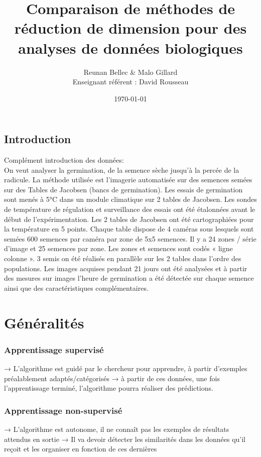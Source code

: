 \documentclass[12pt]{report}
\title{\textbf{Comparaison de méthodes de réduction de dimension pour des analyses de données biologiques}}
\author{Reunan Bellec \& Malo Gillard \\ Enseignant référent : David Rousseau}
\date{\today} %
\begin{document}
\maketitle

\tableofcontents

\thispagestyle{empty} %

\chapter*{Introduction}

Complément introduction des données:\\

On veut analyser la germination, de la semence sèche jusqu’à la percée de la radicule. La méthode utilisée est l'imagerie automatisée sur des semences semées sur des Tables de Jacobsen (bancs de germination).
Les essais de germination sont menés à 5°C dans un module climatique sur 2 tables de Jacobsen. Les sondes de température de régulation et surveillance des essais ont été étalonnées avant le début de l’expérimentation. Les 2 tables de Jacobsen ont été cartographiées pour la température en 5 points.
Chaque table dispose de 4 caméras sous lesquels sont semées 600 semences par caméra par zone de 5x5 semences. Il y a 24 zones / série d’image et 25 semences par zone. Les zones et semences sont codés « ligne colonne ».
3 semis on été réalisés en parallèle sur les 2 tables dans l’ordre des populations.
Les images acquises pendant 21 jours ont été analysées et à partir des mesures sur images l’heure de germination a été détectée sur chaque semence ainsi que des caractéristiques complémentaires.\\


\part{Généralités}

\section{Apprentissage supervisé}
→ L’algorithme est guidé par le chercheur pour apprendre, à partir d’exemples préalablement adaptés/catégorisés
→ à partir de ces données, une fois l’apprentissage terminé, l’algorithme pourra réaliser des prédictions.

\section{Apprentissage non-supervisé}
→ L’algorithme est autonome, il ne connaît pas les exemples de résultats attendus en sortie
→ Il va devoir détecter les similarités dans les données qu’il reçoit et les organiser en fonction de ces dernières
\end{document}
